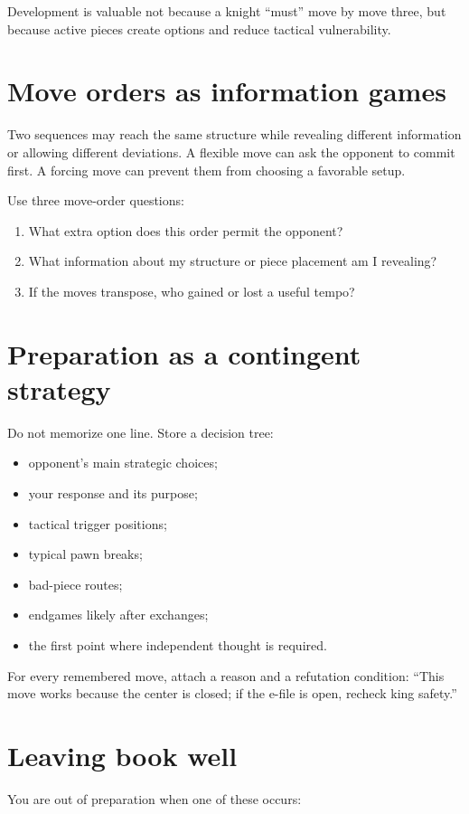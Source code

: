 Development is valuable not because a knight ``must'' move by move three, but because active pieces create options and reduce tactical vulnerability.

\section{Move orders as information games}
Two sequences may reach the same structure while revealing different information or allowing different deviations. A flexible move can ask the opponent to commit first. A forcing move can prevent them from choosing a favorable setup.

Use three move-order questions:

\begin{enumerate}[label=\textbf{\arabic*.},leftmargin=2em]
\item What extra option does this order permit the opponent?
\item What information about my structure or piece placement am I revealing?
\item If the moves transpose, who gained or lost a useful tempo?
\end{enumerate}

\section{Preparation as a contingent strategy}
Do not memorize one line. Store a decision tree:

\begin{itemize}[leftmargin=1.4em]
\item opponent's main strategic choices;
\item your response and its purpose;
\item tactical trigger positions;
\item typical pawn breaks;
\item bad-piece routes;
\item endgames likely after exchanges;
\item the first point where independent thought is required.
\end{itemize}

For every remembered move, attach a reason and a refutation condition: ``This move works because the center is closed; if the e-file is open, recheck king safety.''

\section{Leaving book well}
You are out of preparation when one of these occurs:

